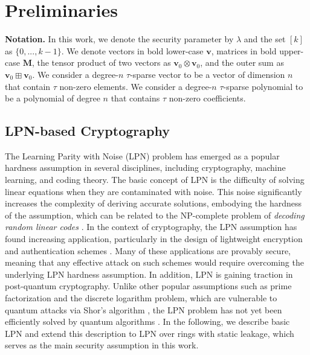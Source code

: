 \chapter{Preliminaries}

\textbf{Notation.} In this work, we denote the security parameter by $\lambda$ and the set $[k]$ as $\{0, ..., k-1\}$. We denote vectors in bold lower-case $\mathbf{v}$, matrices in bold upper-case $\mathbf{M}$, the tensor product of two vectors as $\mathbf{v}_0\otimes\mathbf{v}_0$, and the outer sum as $\mathbf{v}_0\boxplus\mathbf{v}_0$. We consider a degree-$n$ $\tau$-sparse vector to be a vector of dimension $n$ that contain $\tau$ non-zero elements. We consider a degree-$n$ $\tau$-sparse polynomial to be a polynomial of degree $n$ that contains $\tau$ non-zero coefficients.

\section{LPN-based Cryptography}
The Learning Parity with Noise (LPN) problem has emerged as a popular hardness assumption in several disciplines, including cryptography, machine learning, and coding theory. The basic concept of LPN is the difficulty of solving linear equations when they are contaminated with noise. This noise significantly increases the complexity of deriving accurate solutions, embodying the hardness of the assumption, which can be related to the NP-complete problem of \textit{decoding random linear codes} \cite{yu2016pseudorandom}. In the context of cryptography, the LPN assumption has found increasing application, particularly in the design of lightweight encryption and authentication schemes \cite{pietrzak2012cryptography}. Many of these applications are provably secure, meaning that any effective attack on such schemes would require overcoming the underlying LPN hardness assumption. In addition, LPN is gaining traction in post-quantum cryptography. Unlike other popular assumptions such as prime factorization and the discrete logarithm problem, which are vulnerable to quantum attacks via Shor's algorithm \cite{shor1999polynomial}, the LPN problem has not yet been efficiently solved by quantum algorithms \cite{zhao2018hardness}. 
In the following, we describe basic LPN and extend this description to LPN over rings with static leakage, which serves as the main security assumption in this work.

